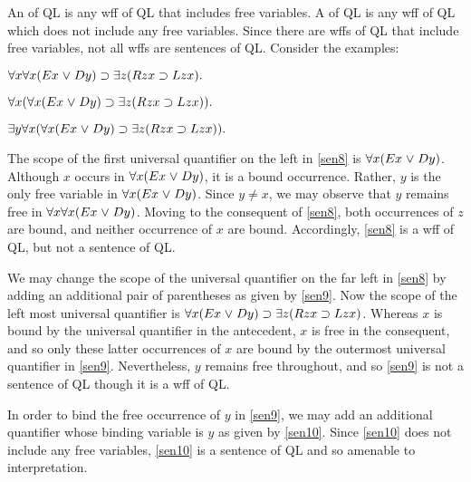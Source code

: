 An  of QL is any wff of QL that includes free variables.
A  of QL is any wff of QL which does not include any free variables.
Since there are wffs of QL that include free variables, not all wffs are sentences of QL.
Consider the examples:

\begin{earg}
  \item[\ex{sen8}] $\forall x\forall x(Ex \mkern1mu\vee\mkern1mu Dy) \supset \exists z(Rzx \supset Lzx).$ 
  \item[\ex{sen9}] $\forall x(\forall x(Ex \mkern1mu\vee\mkern1mu Dy) \supset \exists z(Rzx \supset Lzx)).$ 
  \item[\ex{sen10}] $\exists y\forall x(\forall x(Ex \mkern1mu\vee\mkern1mu Dy) \supset \exists z(Rzx \supset Lzx)).$ 
\end{earg}

The scope of the first universal quantifier on the left in \ref{sen8} is $\forall x(Ex \mkern1mu\vee\mkern1mu Dy)$.
Although $x$ occurs in $\forall x(Ex \mkern1mu\vee\mkern1mu Dy)$, it is a bound occurrence. 
Rather, $y$ is the only free variable in $\forall x(Ex \mkern1mu\vee\mkern1mu Dy)$.
Since $y\neq x$, we may observe that $y$ remains free in $\forall x\forall x(Ex \mkern1mu\vee\mkern1mu Dy)$. 
Moving to the consequent of \ref{sen8}, both occurrences of $z$ are bound, and neither occurrence of $x$ are bound.
Accordingly, \ref{sen8} is a wff of QL, but not a sentence of QL.

We may change the scope of the universal quantifier on the far left in \ref{sen8} by adding an additional pair of parentheses as given by \ref{sen9}.
Now the scope of the left most universal quantifier is $\forall x(Ex \mkern1mu\vee\mkern1mu Dy) \supset \exists z(Rzx \supset Lzx)$.
Whereas $x$ is bound by the universal quantifier in the antecedent, $x$ is free in the consequent, and so only these latter occurrences of $x$ are bound by the outermost universal quantifier in \ref{sen9}. 
Nevertheless, $y$ remains free throughout, and so \ref{sen9} is not a sentence of QL though it is a wff of QL.

In order to bind the free occurrence of $y$ in \ref{sen9}, we may add an additional quantifier whose binding variable is $y$ as given by \ref{sen10}.
Since \ref{sen10} does not include any free variables, \ref{sen10} is a sentence of QL and so amenable to interpretation.

